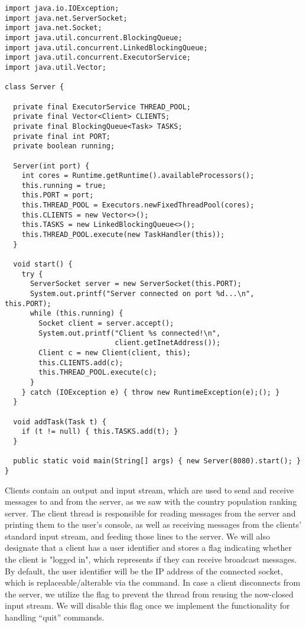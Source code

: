 \newpage
\begin{lstlisting}[language=MyJava]
import java.io.IOException;
import java.net.ServerSocket;
import java.net.Socket;
import java.util.concurrent.BlockingQueue;
import java.util.concurrent.LinkedBlockingQueue;
import java.util.concurrent.ExecutorService;
import java.util.Vector;

class Server {

  private final ExecutorService THREAD_POOL;
  private final Vector<Client> CLIENTS;
  private final BlockingQueue<Task> TASKS;
  private final int PORT;
  private boolean running;

  Server(int port) {
    int cores = Runtime.getRuntime().availableProcessors();
    this.running = true;
    this.PORT = port;
    this.THREAD_POOL = Executors.newFixedThreadPool(cores);
    this.CLIENTS = new Vector<>();
    this.TASKS = new LinkedBlockingQueue<>();
    this.THREAD_POOL.execute(new TaskHandler(this));
  }

  void start() {
    try {
      ServerSocket server = new ServerSocket(this.PORT);
      System.out.printf("Server connected on port %d...\n", this.PORT);
      while (this.running) {
        Socket client = server.accept();
        System.out.printf("Client %s connected!\n", 
                          client.getInetAddress());
        Client c = new Client(client, this);
        this.CLIENTS.add(c);
        this.THREAD_POOL.execute(c);
      }
    } catch (IOException e) { throw new RuntimeException(e);(); }
  }

  void addTask(Task t) {
    if (t != null) { this.TASKS.add(t); }
  }

  public static void main(String[] args) { new Server(8080).start(); }
}
\end{lstlisting}

Clients contain an output and input stream, which are used to send and receive messages to and from the server, as we saw with the country population ranking server. 
The client thread is responsible for reading messages from the server and printing them to the user's console, as well as receiving messages from the clients' standard input stream, and feeding those lines to the server. 
We will also designate that a client has a user identifier and stores a flag indicating whether the client is "logged in", which represents if they can receive broadcast messages. 
By default, the user identifier will be the IP address of the connected socket, which is replaceable/alterable via the  command. 
In case a client disconnects from the server, we utilize the  flag to prevent the thread from reusing the now-closed input stream. 
We will disable this flag once we implement the functionality for handling ``quit'' commands.

